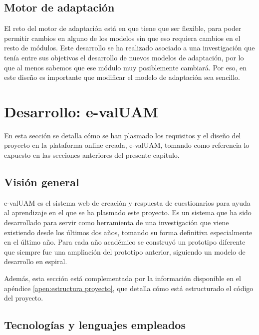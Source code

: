 
\subsection{Motor de adaptación}

El reto del motor de adaptación está en que tiene que ser flexible, para poder permitir cambios en alguno de los modelos sin que eso requiera cambios en el resto de módulos. Este desarrollo se ha realizado asociado a una investigación que tenía entre sus objetivos el desarrollo de nuevos modelos de adaptación, por lo que al menos sabemos que ese módulo muy posiblemente cambiará. Por eso, en este diseño es importante que modificar el modelo de adaptación sea sencillo.



\section{Desarrollo: e-valUAM\label{sec:desarrollo}}

En esta sección se detalla cómo se han plasmado los requisitos y el diseño del proyecto en la plataforma online creada, \acrshort{e-valUAM}, tomando como referencia lo expuesto en las secciones anteriores del presente capítulo.

\subsection{Visión general}

\acrshort{e-valUAM} es el sistema web de creación y respuesta de cuestionarios para ayuda al aprendizaje en el que se ha plasmado este proyecto. Es un sistema que ha sido desarrollado para servir como herramienta de una investigación que viene existiendo desde los últimos dos años, tomando su forma definitiva especialmente en el último año. Para cada año académico se construyó un prototipo diferente que siempre fue una ampliación del prototipo anterior, siguiendo un modelo de desarrollo en espiral.

Además, esta sección está complementada por la información disponible en el apéndice \ref{apen:estructura proyecto}, que detalla cómo está estructurado el código del proyecto.

\subsection{Tecnologías y lenguajes empleados\label{sec:tecnologias}}

